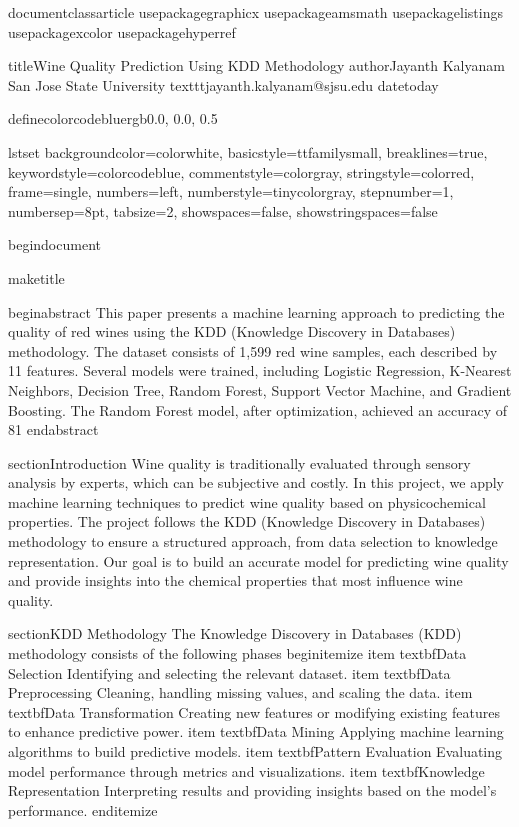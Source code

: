 documentclass{article}
usepackage{graphicx}
usepackage{amsmath}
usepackage{listings}
usepackage{xcolor}
usepackage{hyperref}

title{Wine Quality Prediction Using KDD Methodology}
author{Jayanth Kalyanam  San Jose State University  texttt{jayanth.kalyanam@sjsu.edu}}
date{today}

definecolor{codeblue}{rgb}{0.0, 0.0, 0.5}

lstset{
  backgroundcolor=color{white},
  basicstyle=ttfamilysmall,
  breaklines=true,
  keywordstyle=color{codeblue},
  commentstyle=color{gray},
  stringstyle=color{red},
  frame=single,
  numbers=left,
  numberstyle=tinycolor{gray},
  stepnumber=1,
  numbersep=8pt,
  tabsize=2,
  showspaces=false,
  showstringspaces=false
}

begin{document}

maketitle

begin{abstract}
This paper presents a machine learning approach to predicting the quality of red wines using the KDD (Knowledge Discovery in Databases) methodology. The dataset consists of 1,599 red wine samples, each described by 11 features. Several models were trained, including Logistic Regression, K-Nearest Neighbors, Decision Tree, Random Forest, Support Vector Machine, and Gradient Boosting. The Random Forest model, after optimization, achieved an accuracy of 81%
end{abstract}

section{Introduction}
Wine quality is traditionally evaluated through sensory analysis by experts, which can be subjective and costly. In this project, we apply machine learning techniques to predict wine quality based on physicochemical properties. The project follows the KDD (Knowledge Discovery in Databases) methodology to ensure a structured approach, from data selection to knowledge representation. Our goal is to build an accurate model for predicting wine quality and provide insights into the chemical properties that most influence wine quality.

section{KDD Methodology}
The Knowledge Discovery in Databases (KDD) methodology consists of the following phases
begin{itemize}
    item textbf{Data Selection} Identifying and selecting the relevant dataset.
    item textbf{Data Preprocessing} Cleaning, handling missing values, and scaling the data.
    item textbf{Data Transformation} Creating new features or modifying existing features to enhance predictive power.
    item textbf{Data Mining} Applying machine learning algorithms to build predictive models.
    item textbf{Pattern Evaluation} Evaluating model performance through metrics and visualizations.
    item textbf{Knowledge Representation} Interpreting results and providing insights based on the model’s performance.
end{itemize}

